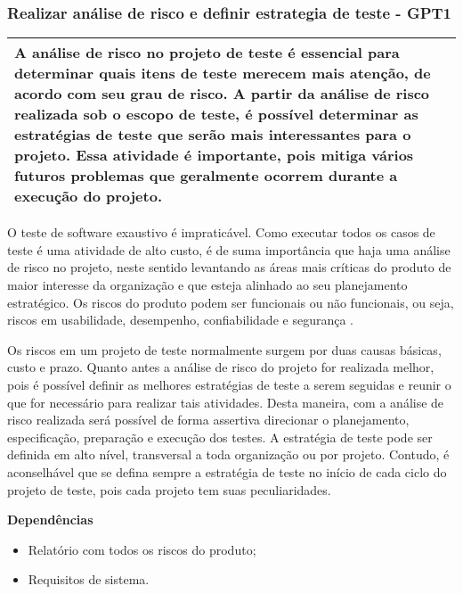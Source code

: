 \subsubsection{Realizar análise de risco e definir estrategia de teste - GPT1}
\label{sec:gpt1}

\begin{table}[!ht]
\centering
\begin{tabular}{|p{130mm}|}
\hline
A análise de risco no projeto de teste é essencial para determinar quais itens de teste merecem mais atenção, de acordo com seu grau de risco. A partir da análise de risco realizada sob o escopo de teste, é possível determinar as estratégias de teste que serão mais interessantes para o projeto. Essa atividade é importante, pois mitiga vários futuros problemas que geralmente ocorrem durante a execução do projeto. \\
\hline
\end{tabular}
\end{table}

O teste de software exaustivo é impraticável. Como executar todos os casos de teste é uma atividade de alto custo, é de suma importância que haja uma análise de risco no projeto, neste sentido levantando as áreas mais críticas do produto de maior interesse da organização e que esteja alinhado ao seu planejamento estratégico. Os riscos do produto podem ser funcionais ou não funcionais, ou seja, riscos em usabilidade, desempenho, confiabilidade e segurança \cite{GuiaMPTbr}. 

Os riscos em um projeto de teste normalmente surgem por duas causas básicas, custo e prazo. Quanto antes a análise de risco do projeto for realizada melhor, pois é possível definir as melhores estratégias de teste a serem seguidas e reunir o que for necessário para realizar tais atividades. Desta maneira, com a análise de risco realizada será possível de forma assertiva direcionar o planejamento, especificação, preparação e execução dos testes. A estratégia de teste pode ser definida em alto nível, transversal a toda organização ou por projeto. Contudo, é aconselhável que se defina sempre a estratégia de teste no início de cada ciclo do projeto de teste, pois cada projeto tem suas peculiaridades.

\textbf{Dependências}

\begin{itemize}
    \item Relatório com todos os riscos do produto;
    \item Requisitos de sistema.
\end{itemize}

